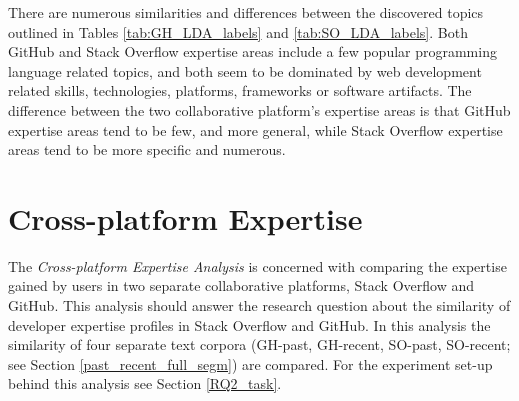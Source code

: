             There are numerous similarities and differences between the discovered topics outlined in Tables \ref{tab:GH_LDA_labels} and \ref{tab:SO_LDA_labels}. Both GitHub and Stack Overflow expertise areas include a few popular programming language related topics, and both seem to be dominated by web development related skills, technologies, platforms, frameworks or software artifacts. The difference between the two collaborative platform's expertise areas is that GitHub expertise areas tend to be few, and more general, while Stack Overflow expertise areas tend to be more specific and numerous.  \\
        
    
    \section{Cross-platform Expertise\label{sec:results_rq2}}
        
        The \emph{Cross-platform Expertise Analysis} is concerned with comparing the expertise gained by users in two separate collaborative platforms, Stack Overflow and GitHub. This analysis should answer the research question about the similarity of developer expertise profiles in Stack Overflow and GitHub. In this analysis the similarity of four separate text corpora (GH-past, GH-recent, SO-past, SO-recent; see Section \ref{past_recent_full_segm}) are compared. For the experiment set-up behind this analysis see Section \ref{RQ2_task}.
        
